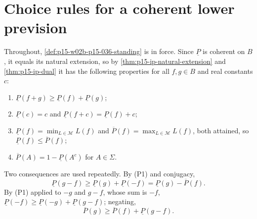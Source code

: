 \section{Choice rules for a coherent lower prevision}
\label{sec:annex-p15-w02b-p15-036}

Throughout, \cref{def:p15-w02b-p15-036-standing} is in force. Since
\(\underline P\) is coherent on \(B\), it equals its natural extension, so
by \cref{thm:p15-ip-natural-extension} and \cref{thm:p15-ip-dual} it has
the following properties for all \(f,g\in B\) and real constants \(c\):
\begin{enumerate}
\item[(P1)] \(\underline P(f+g)\geq\underline P(f)+\underline P(g)\);
\item[(P2)] \(\underline P(c)=c\) and \(\underline P(f+c)=\underline P(f)+c\);
\item[(P3)] \(\underline P(f)=\min_{L\in\mathcal M}L(f)\) and
 \(\overline P(f)=\max_{L\in\mathcal M}L(f)\), both attained, so
 \(\underline P(f)\leq\overline P(f)\);
\item[(P4)] \(\overline P(A)=1-\underline P(A^c)\) for \(A\in\Sigma\).
\end{enumerate}
Two consequences are used repeatedly. By (P1) and conjugacy,
\[
 \underline P(g-f)\geq\underline P(g)+\underline P(-f)
 =\underline P(g)-\overline P(f).\tag{M1}
\]
By (P1) applied to \(-g\) and \(g-f\), whose sum is \(-f\),
\(\underline P(-f)\geq\underline P(-g)+\underline P(g-f)\); negating,
\[
 \overline P(g)\geq\overline P(f)+\underline P(g-f).\tag{M2}
\]

